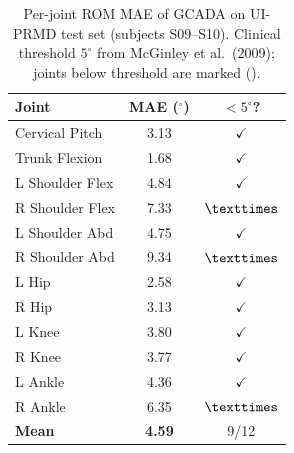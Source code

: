 \begin{table}[ht]
\centering
\caption{Per-joint ROM MAE of GCADA on UI-PRMD test set
(subjects S09--S10). Clinical threshold $5^\circ$ from
McGinley et al.\ (2009); joints below threshold are marked (\checkmark).}
\label{tab:per_joint_mae}
\begin{tabular}{|l|c|c|}
\hline
\textbf{Joint} & \textbf{MAE ($^\circ$)} & \textbf{$<5^\circ$?} \\
\hline
    Cervical Pitch         & 3.13 & $\checkmark$ \\
    Trunk Flexion          & 1.68 & $\checkmark$ \\
    L Shoulder Flex        & 4.84 & $\checkmark$ \\
    R Shoulder Flex        & 7.33 & $\texttimes$ \\
    L Shoulder Abd         & 4.75 & $\checkmark$ \\
    R Shoulder Abd         & 9.34 & $\texttimes$ \\
    L Hip                  & 2.58 & $\checkmark$ \\
    R Hip                  & 3.13 & $\checkmark$ \\
    L Knee                 & 3.80 & $\checkmark$ \\
    R Knee                 & 3.77 & $\checkmark$ \\
    L Ankle                & 4.36 & $\checkmark$ \\
    R Ankle                & 6.35 & $\texttimes$ \\
\hline
    \textbf{Mean} & \textbf{4.59} & 9/12 \\
\hline
\end{tabular}
\end{table}
